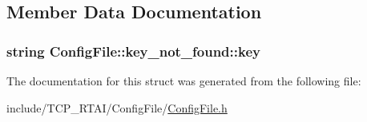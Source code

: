 \subsection{Member Data Documentation}
\hypertarget{structConfigFile_1_1key__not__found_a2872cbeb5ab860f357b3a58dd867b90b}{
\subsubsection[{key}]{\setlength{\rightskip}{0pt plus 5cm}string {\bf ConfigFile::key\_\-not\_\-found::key}}}
\label{structConfigFile_1_1key__not__found_a2872cbeb5ab860f357b3a58dd867b90b}


The documentation for this struct was generated from the following file:\begin{DoxyCompactItemize}
\item 
include/TCP\_\-RTAI/ConfigFile/\hyperlink{ConfigFile_8h}{ConfigFile.h}\end{DoxyCompactItemize}
